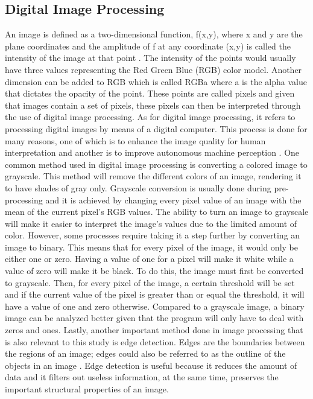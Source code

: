 \documentclass[journal]{./IEEE/IEEEtran}
\begin{document}
\subsection{Digital Image Processing}
An image is defined as a two-dimensional function, f(x,y), where x and y are the plane coordinates and the amplitude of f at any coordinate (x,y) is called the intensity of the image at that point \cite{Gonzalez2002}. The intensity of the points would usually have three values representing the Red Green Blue (RGB) color model. Another dimension can be added to RGB which is called RGBa where a is the alpha value that dictates the opacity of the point. These points are called pixels and given that images contain a set of pixels, these pixels can then be interpreted through the use of digital image processing.
\newline
\indent As for digital image processing, it refers to processing digital images by means of a digital computer. This process is done for many reasons, one of which is to enhance the image quality for human interpretation and another is to improve autonomous machine perception \cite{AbriolSantos12018}.
\newline
\indent One common method used in digital image processing is converting a colored image to grayscale. This method will remove the different colors of an image, rendering it to have shades of gray only. Grayscale conversion is usually done during pre-processing and it is achieved by changing every pixel value of an image with the mean of the current pixel's RGB values.
\newline
\indent The ability to turn an image to grayscale will make it easier to interpret the image's values due to the limited amount of color. However, some processes require taking it a step further by converting an image to binary. This means that for every pixel of the image, it would only be either one or zero. Having a value of one for a pixel will make it white while a value of zero will make it be black. To do this, the image must first be converted to grayscale. Then, for every pixel of the image, a certain threshold will be set and if the current value of the pixel is greater than or equal the threshold, it will have a value of one and zero otherwise. Compared to a grayscale image, a binary image can be analyzed better given that the program will only have to deal with zeros and ones.
\newline
\indent Lastly, another important method done in image processing that is also relevant to this study is edge detection. Edges are the boundaries between the regions of an image; edges could also be referred to as the outline of the objects in an image \cite{Sharma2013}. Edge detection is useful because it reduces the amount of data and it filters out useless information, at the same time, preserves the important structural properties of an image. 
\end{document}
